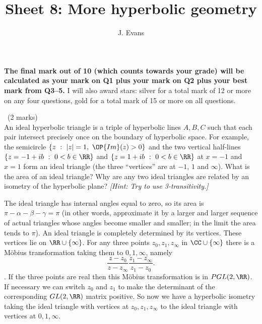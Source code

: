 \documentclass[12pt]{article}
\title{Sheet 8: More hyperbolic geometry}
\author{J. Evans}
\date{}
\begin{document}
\maketitle

\bigskip

{\bf The final mark out of 10 (which counts towards your grade) will be calculated as your mark on Q1 plus your mark on Q2 plus your best mark from Q3--5.} I will also award stars: silver for a total mark of 12 or more on any four questions, gold for a total mark of 15 or more on all questions.

\vspace{1cm}

\begin{question}\ (2 marks)\\
An ideal hyperbolic triangle is a triple of hyperbolic lines $A,B,C$ such that each pair intersect precisely once on the boundary of hyperbolic space. For example, the semicircle $\{z\ :\ |z|=1,\ \OP{Im}(z)>0\}$ and the two vertical half-lines $\{z=-1+ib\ :\ 0<b\in\RR\}$ and $\{z=1+ib\ :\ 0<b\in\RR\}$ at $x=-1$ and $x=1$ form an ideal triangle (the three ``vertices'' are at $-1$, $1$ and $\infty$). What is the area of an ideal triangle? Why are any two ideal triangles are related by an isometry of the hyperbolic plane? {\em [Hint: Try to use 3-transitivity.]}
\end{question}

\begin{answer}
  The ideal triangle has internal angles equal to zero, so its area is $\pi-\alpha-\beta-\gamma=\pi$ (in other words, approximate it by a larger and larger sequence of actual triangles whose angles become smaller and smaller; in the limit the area tends to $\pi$). An ideal triangle is completely determined by its vertices. These vertices lie on $\RR\cup\{\infty\}$. For any three points $z_0,z_1,z_\infty$ in $\CC\cup\{\infty\}$ there is a M\"obius transformation taking them to $0,1,\infty$, namely
  \[\frac{z-z_0}{z-z_\infty}\frac{z_1-z_\infty}{z_1-z_0}.\]
  . If the three points are real then this M\"obius transformation is in $PGL(2,\RR)$. If necessary we can switch $z_0$ and $z_1$ to make the determinant of the corresponding $GL(2,\RR)$ matrix positive. So now we have a hyperbolic isometry taking the ideal triangle with vertices at $z_0,z_1,z_\infty$ to the ideal triangle with vertices at $0,1,\infty$.
\end{answer}
\newpage

\vspace{1cm}
\end{document}
